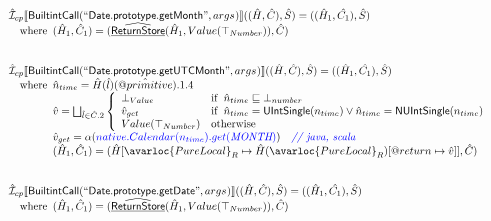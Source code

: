 \[
\begin{array}{l}
\aI _{cp}\lbr \SF{BuiltintCall}(``\SF{Date.prototype.getMonth}",args_{})\rbr((\hat{H},\hat{C}), \hat{S})
  = ((\hat{H}_1, \hat{C_1}), \hat{S})\\
\quad\wherec{
  (\hat{H}_1, \hat{C}_1) = (\ahf{ReturnStore}(\hat{H}_1, Value(\top_{Number})), \hat{C})
  }\\
\\\\

\aI _{cp}\lbr \SF{BuiltintCall}(``\SF{Date.prototype.getUTCMonth}",args_{})\rbr((\hat{H},\hat{C}), \hat{S})
  = ((\hat{H}_1, \hat{C_1}), \hat{S})\\
\quad\wherec{
  \hat{n}_{time} = \hat{H}(\hat{l})(\avarprop{primitive}).1.4\\
  \hat{v} = \bigsqcup_{\hat{l} \in \hat{C}.2} \left\{\begin{array}{ll}
      \bot_{Value} & \ifc{\hat{n}_{time} \sqsubseteq  \bot_{number}}\\
      \hat{v}_{get} &
      \ifc{\hat{n}_{time} = \SF{UIntSingle}(n_{time}) \lor\hat{n}_{time} = \SF{NUIntSingle}(n_{time}) }\\
      Value(\top_{Number}) & \owc
    \end{array}\right.\\
  \hat{v}_{get} = \alpha({\inblue native.Calendar(n_{time}).get(\emph{MONTH})})
    \quad\comment{{\inblue // java, scala}}\\  
  (\hat{H}_1, \hat{C}_1) = 
    (\hat{H}[\avarloc{PureLocal}_R \mapsto \hat{H}(\avarloc{PureLocal}_R)
      [\varprop{return} \mapsto \hat{v}]], \hat{C})\\
  }\\
\\\\

\aI _{cp}\lbr \SF{BuiltintCall}(``\SF{Date.prototype.getDate}",args_{})\rbr((\hat{H},\hat{C}), \hat{S})
  = ((\hat{H}_1, \hat{C_1}), \hat{S})\\
\quad\wherec{
  (\hat{H}_1, \hat{C}_1) = (\ahf{ReturnStore}(\hat{H}_1, Value(\top_{Number})), \hat{C})
  }\\
\\\\



\end{array}\]
